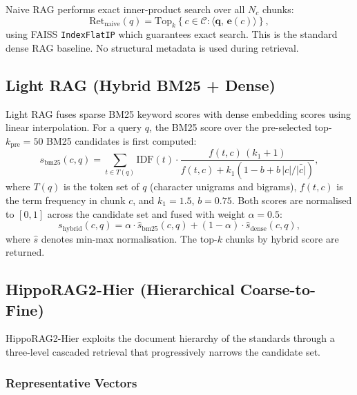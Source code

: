 \documentclass[twocolumn]{article}
\begin{document}
Naive RAG performs exact inner-product search over all $N_c$ chunks:
\begin{equation}
  \mathrm{Ret}_{\mathrm{naive}}(q)
  = \mathrm{Top}_k\!\left\{c \in \mathcal{C} :
    \langle \mathbf{q},\, \mathbf{e}(c) \rangle \right\},
  \label{eq:naive}
\end{equation}
using FAISS \texttt{IndexFlatIP} which guarantees exact search.
This is the standard dense RAG baseline.
No structural metadata is used during retrieval.

\subsection{Light RAG (Hybrid BM25 + Dense)}
\label{sec:light}

Light RAG fuses sparse BM25 keyword scores with dense embedding scores
using linear interpolation.
For a query $q$, the BM25 score over the pre-selected top-$k_{\mathrm{pre}}=50$
BM25 candidates is first computed:
\begin{equation}
  s_{\mathrm{bm25}}(c, q)
  = \sum_{t \in T(q)} \mathrm{IDF}(t) \cdot
    \frac{f(t,c)\,(k_1+1)}{f(t,c) + k_1(1-b+b\,|c|/\bar{|c|})},
  \label{eq:bm25}
\end{equation}
where $T(q)$ is the token set of $q$ (character unigrams and bigrams),
$f(t,c)$ is the term frequency in chunk $c$, and $k_1=1.5$, $b=0.75$.
Both scores are normalised to $[0, 1]$ across the candidate set
and fused with weight $\alpha = 0.5$:
\begin{equation}
  s_{\mathrm{hybrid}}(c, q)
  = \alpha \cdot \hat{s}_{\mathrm{bm25}}(c,q)
  + (1-\alpha) \cdot \hat{s}_{\mathrm{dense}}(c,q),
  \label{eq:hybrid}
\end{equation}
where $\hat{s}$ denotes min-max normalisation.
The top-$k$ chunks by hybrid score are returned.

\subsection{HippoRAG2-Hier (Hierarchical Coarse-to-Fine)}
\label{sec:hippo2}

HippoRAG2-Hier exploits the document hierarchy of the standards through a
three-level cascaded retrieval that progressively narrows the candidate set.

\subsubsection{Representative Vectors}
\end{document}
